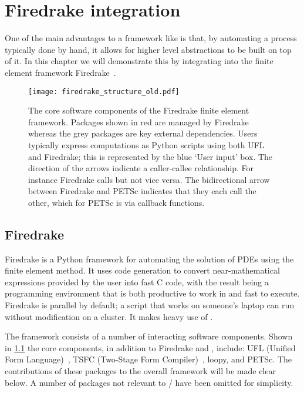 \documentclass[thesis]{subfiles}
\begin{document}
\chapter{Firedrake integration}
\label{chapter:firedrake}

One of the main advantages to a framework like  is that, by automating a process typically done by hand, it allows for higher level abstractions to be built on top of it.
In this chapter we will demonstrate this by integrating  into the finite element framework Firedrake~\cite{FiredrakeUserManual}.

\begin{figure}
  \texttt{[image: firedrake\_structure\_old.pdf]}
  \caption{
    The core software components of the Firedrake finite element framework.
    Packages shown in red are managed by Firedrake whereas the grey packages are key external dependencies.
    Users typically express computations as Python scripts using both UFL and Firedrake; this is represented by the blue `User input' box.
    The direction of the arrows indicate a caller-callee relationship.
    For instance Firedrake calls  but not vice versa.
    The bidirectional arrow between Firedrake and PETSc indicates that they each call the other, which for PETSc is via callback functions.
  }
  \label{fig:firedrake_structure_old}
\end{figure}

\section{Firedrake}

Firedrake is a Python framework for automating the solution of PDEs using the finite element method.
It uses code generation to convert near-mathematical expressions provided by the user into fast C code, with the result being a programming environment that is both productive to work in and fast to execute.
Firedrake is parallel by default; a script that works on someone's laptop can run without modification on a cluster\footnotemark.
It makes heavy use of .


The framework consists of a number of interacting software components.
Shown in \cref{fig:firedrake_structure_old} the core components, in addition to Firedrake and , include: UFL (Unified Form Language)~\cite{alnaesUnifiedFormLanguage2014a}, TSFC (Two-Stage Form Compiler)~\cite{homolyaTSFCStructurePreservingForm2018}, loopy, and PETSc.
The contributions of these packages to the overall framework will be made clear below.
A number of packages not relevant to / have been omitted for simplicity.
\end{document}
